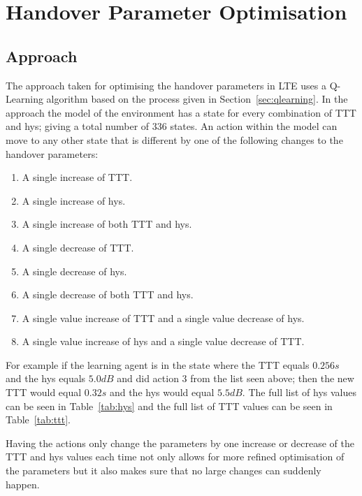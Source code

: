 \chapter{Handover Parameter Optimisation}\label{handover parameter optimisation}
\section{Approach}\label{approach}
The approach taken for optimising the handover parameters in LTE uses a Q-Learning algorithm based on the process given in Section~\ref{sec:qlearning}. In the approach the model of the environment has a state for every combination of TTT and hys; giving a total number of 336 states. An action within the model can move to any other state that is different by one of the following changes to the handover parameters:

\begin{enumerate}
	\item A single increase of TTT.
	\item A single increase of hys.
	\item A single increase of both TTT and hys.
	\item A single decrease of TTT.
	\item A single decrease of hys.
	\item A single decrease of both TTT and hys.
	\item A single value increase of TTT and a single value decrease of hys.
	\item A single value increase of hys and a single value decrease of TTT.
\end{enumerate}

For example if the learning agent is in the state where the TTT equals $0.256 s$ and the hys equals $5.0 dB$ and did action 3 from the list seen above; then the new TTT would equal $0.32 s$ and the hys would equal $5.5 dB$. The full list of hys values can be seen in Table~\ref{tab:hys} and the full list of TTT values can be seen in Table~\ref{tab:ttt}.

Having the actions only change the parameters by one increase or decrease of the TTT and hys values each time not only allows for more refined optimisation of the parameters but it also makes sure that no large changes can suddenly happen.

